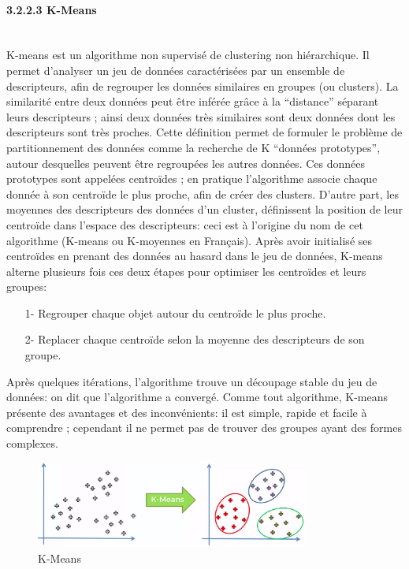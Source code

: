 \paragraph{{\large 3.2.2.3 K-Means}\\\\}
K-means est un algorithme non supervisé de clustering non hiérarchique. Il permet d’analyser un jeu de données caractérisées par un ensemble de descripteurs, afin de regrouper les données similaires en groupes (ou clusters). La similarité entre deux données peut être inférée grâce à la “distance” séparant leurs descripteurs ; ainsi deux données très similaires sont deux données dont les descripteurs sont très proches. Cette définition permet de formuler le problème de partitionnement des données comme la recherche de K “données prototypes”, autour desquelles peuvent être regroupées les autres données. Ces données prototypes sont appelées centroïdes ; en pratique l’algorithme associe chaque donnée à son centroïde le plus proche, afin de créer des clusters. D’autre part, les moyennes des descripteurs des données d’un cluster, définissent la position de leur centroïde dans l’espace des descripteurs: ceci est à l’origine du nom de cet algorithme (K-means ou K-moyennes en Français). Après avoir initialisé ses centroïdes en prenant des données au hasard dans le jeu de données, K-means alterne plusieurs fois ces deux étapes pour optimiser les centroïdes et leurs groupes:\\
\begin{itemize}
\item[1-]Regrouper chaque objet autour du centroïde le plus proche.
\item[2-]Replacer chaque centroïde selon la moyenne des descripteurs de son groupe.\\
\end{itemize}

Après quelques itérations, l’algorithme trouve un découpage stable du jeu de données: on dit que l’algorithme a convergé. Comme tout algorithme, K-means présente des avantages et des inconvénients: il est simple, rapide et facile à comprendre ; cependant il ne permet pas de trouver des groupes ayant des formes complexes.

\begin{figure}[h]
\centering
\includegraphics[width=0.8\textwidth]{Figures/K-means}
\decoRule
\caption{K-Means}
\label{fig:K-means}
\end{figure}


